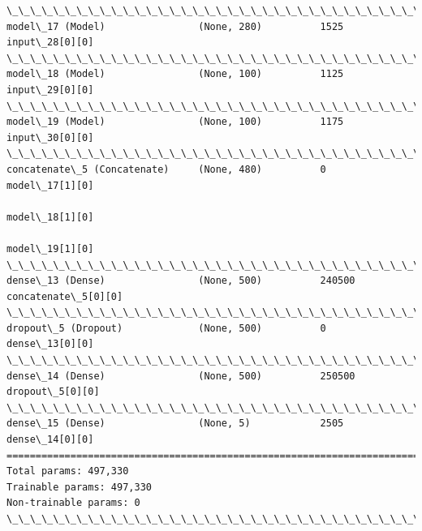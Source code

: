 \documentclass[11pt]{article}
\begin{document}
\begin{Verbatim}[commandchars=\\\{\}]
\_\_\_\_\_\_\_\_\_\_\_\_\_\_\_\_\_\_\_\_\_\_\_\_\_\_\_\_\_\_\_\_\_\_\_\_\_\_\_\_\_\_\_\_\_\_\_\_\_\_\_\_\_\_\_\_\_\_\_\_\_\_\_\_\_\_\_\_\_\_\_\_\_\_\_\_\_\_\_\_\_\_\_\_\_\_\_\_\_\_\_\_\_\_\_\_\_\_
model\_17 (Model)                (None, 280)          1525        input\_28[0][0]                   
\_\_\_\_\_\_\_\_\_\_\_\_\_\_\_\_\_\_\_\_\_\_\_\_\_\_\_\_\_\_\_\_\_\_\_\_\_\_\_\_\_\_\_\_\_\_\_\_\_\_\_\_\_\_\_\_\_\_\_\_\_\_\_\_\_\_\_\_\_\_\_\_\_\_\_\_\_\_\_\_\_\_\_\_\_\_\_\_\_\_\_\_\_\_\_\_\_\_
model\_18 (Model)                (None, 100)          1125        input\_29[0][0]                   
\_\_\_\_\_\_\_\_\_\_\_\_\_\_\_\_\_\_\_\_\_\_\_\_\_\_\_\_\_\_\_\_\_\_\_\_\_\_\_\_\_\_\_\_\_\_\_\_\_\_\_\_\_\_\_\_\_\_\_\_\_\_\_\_\_\_\_\_\_\_\_\_\_\_\_\_\_\_\_\_\_\_\_\_\_\_\_\_\_\_\_\_\_\_\_\_\_\_
model\_19 (Model)                (None, 100)          1175        input\_30[0][0]                   
\_\_\_\_\_\_\_\_\_\_\_\_\_\_\_\_\_\_\_\_\_\_\_\_\_\_\_\_\_\_\_\_\_\_\_\_\_\_\_\_\_\_\_\_\_\_\_\_\_\_\_\_\_\_\_\_\_\_\_\_\_\_\_\_\_\_\_\_\_\_\_\_\_\_\_\_\_\_\_\_\_\_\_\_\_\_\_\_\_\_\_\_\_\_\_\_\_\_
concatenate\_5 (Concatenate)     (None, 480)          0           model\_17[1][0]                   
                                                                 model\_18[1][0]                   
                                                                 model\_19[1][0]                   
\_\_\_\_\_\_\_\_\_\_\_\_\_\_\_\_\_\_\_\_\_\_\_\_\_\_\_\_\_\_\_\_\_\_\_\_\_\_\_\_\_\_\_\_\_\_\_\_\_\_\_\_\_\_\_\_\_\_\_\_\_\_\_\_\_\_\_\_\_\_\_\_\_\_\_\_\_\_\_\_\_\_\_\_\_\_\_\_\_\_\_\_\_\_\_\_\_\_
dense\_13 (Dense)                (None, 500)          240500      concatenate\_5[0][0]              
\_\_\_\_\_\_\_\_\_\_\_\_\_\_\_\_\_\_\_\_\_\_\_\_\_\_\_\_\_\_\_\_\_\_\_\_\_\_\_\_\_\_\_\_\_\_\_\_\_\_\_\_\_\_\_\_\_\_\_\_\_\_\_\_\_\_\_\_\_\_\_\_\_\_\_\_\_\_\_\_\_\_\_\_\_\_\_\_\_\_\_\_\_\_\_\_\_\_
dropout\_5 (Dropout)             (None, 500)          0           dense\_13[0][0]                   
\_\_\_\_\_\_\_\_\_\_\_\_\_\_\_\_\_\_\_\_\_\_\_\_\_\_\_\_\_\_\_\_\_\_\_\_\_\_\_\_\_\_\_\_\_\_\_\_\_\_\_\_\_\_\_\_\_\_\_\_\_\_\_\_\_\_\_\_\_\_\_\_\_\_\_\_\_\_\_\_\_\_\_\_\_\_\_\_\_\_\_\_\_\_\_\_\_\_
dense\_14 (Dense)                (None, 500)          250500      dropout\_5[0][0]                  
\_\_\_\_\_\_\_\_\_\_\_\_\_\_\_\_\_\_\_\_\_\_\_\_\_\_\_\_\_\_\_\_\_\_\_\_\_\_\_\_\_\_\_\_\_\_\_\_\_\_\_\_\_\_\_\_\_\_\_\_\_\_\_\_\_\_\_\_\_\_\_\_\_\_\_\_\_\_\_\_\_\_\_\_\_\_\_\_\_\_\_\_\_\_\_\_\_\_
dense\_15 (Dense)                (None, 5)            2505        dense\_14[0][0]                   
==================================================================================================
Total params: 497,330
Trainable params: 497,330
Non-trainable params: 0
\_\_\_\_\_\_\_\_\_\_\_\_\_\_\_\_\_\_\_\_\_\_\_\_\_\_\_\_\_\_\_\_\_\_\_\_\_\_\_\_\_\_\_\_\_\_\_\_\_\_\_\_\_\_\_\_\_\_\_\_\_\_\_\_\_\_\_\_\_\_\_\_\_\_\_\_\_\_\_\_\_\_\_\_\_\_\_\_\_\_\_\_\_\_\_\_\_\_

    \end{Verbatim}
\end{document}
